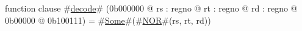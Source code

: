 function clause #\hyperref[zdecode]{decode}# (0b000000 @ rs : regno @ rt : regno @ rd : regno @ 0b00000 @ 0b100111) =
  #\hyperref[zSome]{Some}#(#\hyperref[zNOR]{NOR}#(rs, rt, rd))
